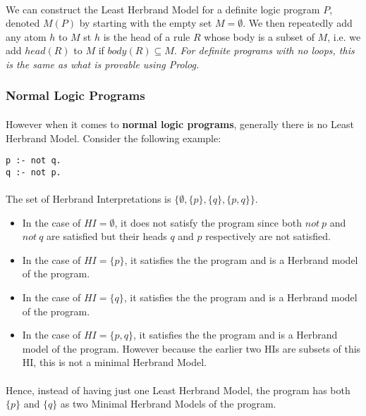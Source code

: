 \documentclass{article}
\theoremstyle{plain}
\theoremstyle{definition}
\begin{document}
\begin{multicols}{2}
\paragraph{} We can construct the Least Herbrand Model for a definite logic program $P$, denoted $M(P)$ by starting with the empty set $M = \emptyset$. We then repeatedly add any atom $h$ to $M$ st $h$ is the head of a rule $R$ whose body is a subset of $M$, i.e. we add $head(R)$ to $M$ if $body(R) \subseteq M$. \textit{For definite programs with no loops, this is the same as what is provable using Prolog.}

\subsubsection{Normal Logic Programs}

\paragraph{} However when it comes to \textbf{normal logic programs}, generally there is no Least Herbrand Model. Consider the following example:

\begin{lstlisting}
p :- not q.
q :- not p.
\end{lstlisting}

\paragraph{} The set of Herbrand Interpretations is $\{\emptyset, \{p\}, \{q\}, \{p ,q\}\}$.

\begin{itemize}
\item In the case of $HI = \emptyset$, it does not satisfy the program since both $not\ p$ and $not\ q$ are satisfied but their heads $q$ and $p$ respectively are not satisfied. 
\item In the case of $HI = \{p\}$, it satisfies the the program and is a Herbrand model of the program.
\item In the case of $HI = \{q\}$, it satisfies the the program and is a Herbrand model of the program.
\item In the case of $HI = \{p, q\}$, it satisfies the the program and is a Herbrand model of the program. However because the earlier two HIs are subsets of this HI, this is not a minimal Herbrand Model.
\end{itemize}

\paragraph{} Hence, instead of having just one Least Herbrand Model, the program has both $\{p\}$ and $\{q\}$ as two Minimal Herbrand Models of the program.


\end{multicols}
\end{document}
